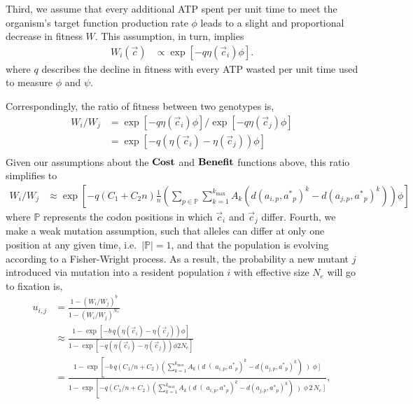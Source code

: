 \documentclass{article}
\newcommand{\setP}{\ensuremath{\mathbb{P}}\xspace}
\newcommand{\Ne}{\ensuremath{{N_e}}\xspace} %
\newcommand{\kmax}{\ensuremath{{k_{\max}}}\xspace}
\newcommand{\cvec}{\ensuremath{\Vec{c}}\xspace}
\newcommand{\cveci}{\ensuremath{\cvec_i}\xspace}
\newcommand{\cvecj}{\ensuremath{\cvec_j}\xspace}
\newcommand{\aip}{\ensuremath{a_{i,p}}\xspace}
\newcommand{\ajp}{\ensuremath{a_{j,p}}\xspace}
\newcommand{\aopt}{\ensuremath{a^*}\xspace}
\newcommand{\aoptp}{\ensuremath{\aopt_p}\xspace}
\newcommand{\Cost}{\ensuremath{\text{\textbf{Cost}}}\xspace}
\newcommand{\Func}{\ensuremath{\text{\textbf{Benefit}}}\xspace}
\begin{document}
Third, we assume that every additional ATP spent per unit time to meet the organism's target function production rate $\phi$ leads to a slight and proportional decrease in fitness $W$.
This assumption, in turn, implies 
\begin{align}
  W_i\left(\cvec\right) &\propto \exp\left[- q \eta(\cveci) \phi\right].
\end{align}
where $q$ describes the decline in fitness with every ATP wasted per unit time used to measure $\phi$ and $\psi$.

Correspondingly, the ratio of fitness between two genotypes is,
\begin{align*}
  W_i/W_j &=  \exp\left[- q \eta(\cveci) \phi\right]/\exp\left[- q \eta(\cvecj) \phi\right]\\
  &=  \exp\left[- q \left(\eta(\cveci)- \eta(\cvecj)\right) \phi\right]\\
\end{align*}
Given our assumptions about the \Cost and \Func functions above, this ratio simplifies to
\begin{align}
  W_i/W_j &\approx \exp\left[- q \left(C_1 + C_2 n\right) \frac{1}{n}\left(\sum_{p \in \setP} \sum_{k=1}^\kmax A_k \left(d\left(\aip,\aoptp\right)^k - d\left(\ajp,\aoptp\right)^k\right)\right) \phi \right]
\end{align}
where \setP represents the codon positions in which \cveci and \cvecj differ.
Fourth, we make a weak mutation assumption, such that alleles can differ at only one position at any given time, i.e.~$|\setP| = 1$, and that the population is evolving according to a Fisher-Wright process.
As a result, the probability a new mutant $j$ introduced via mutation into a resident population $i$ with effective size \Ne will go to fixation is,
\begin{align*}
  u_{i,j} &=  \frac{1 - \left(W_i/W_j\right)^b}{1 - \left(W_i/W_j\right)^\Ne}\\
   &\approx \frac{1-\exp\left[- b\,q \left(\eta(\cveci)- \eta(\cvecj)\right) \phi\right]}{1-\exp\left[- q \left(\eta(\cveci)- \eta(\cvecj)\right) \phi 2\Ne\right]}\\
   &= \frac{1- \exp\left[- b\,q \left(C_1/n + C_2\right)\left(\sum_{k=1}^\kmax A_k \left(d\right(\aip,\aoptp\right)^k - d\left(\ajp,\aoptp\right)^k\right)\left) \phi\right]}{1-\exp\left[- q \left(C_1/n + C_2\right)\left(\sum_{k=1}^\kmax A_k \left(d\right(\aip,\aoptp\right)^k - d\left(\ajp,\aoptp\right)^k\right)\left) \phi \, 2 \, \Ne\right]},
\end{align*}
\end{document}
